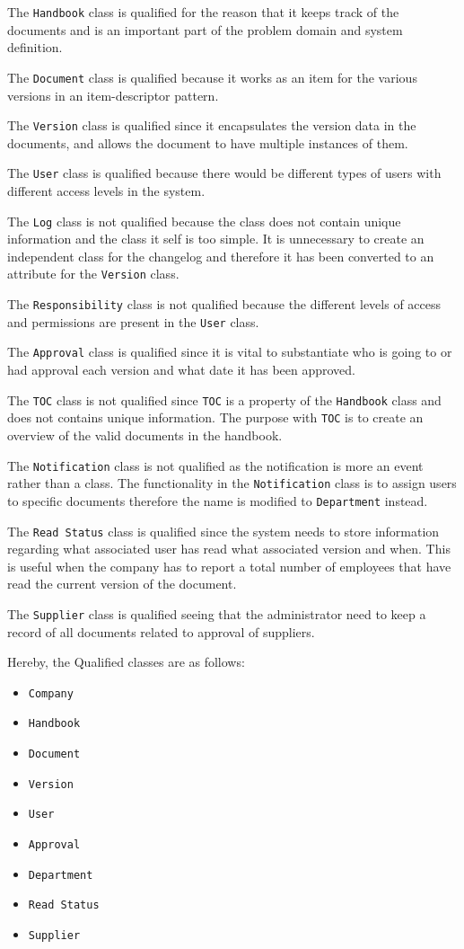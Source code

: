 The \texttt{Handbook} class is qualified for the reason that it keeps track of the documents and is an important part of the problem domain and system definition.

The \texttt{Document} class is qualified because it works as an item for the various versions in an item-descriptor pattern.

The \texttt{Version} class is qualified since it encapsulates the version data in the documents, and allows the document to have multiple instances of them.

The \texttt{User} class is qualified because there would be different types of users with different access levels in the system.

The \texttt{Log} class is not qualified because the class does not contain unique information and the class it self is too simple.
It is unnecessary to create an independent class for the changelog and therefore it has been converted to an attribute for the \texttt{Version} class.

The \texttt{Responsibility} class is not qualified because the different levels of access and permissions are present in the \texttt{User} class.

The \texttt{Approval} class is qualified since it is vital to substantiate who is going to or had approval each version and what date it has been approved.

The \texttt{TOC} class is not qualified since \texttt{TOC} is a property of the \texttt{Handbook} class and does not contains unique information.
The purpose with \texttt{TOC} is to create an overview of the valid documents in the handbook.

The \texttt{Notification} class is not qualified as the notification is more an event rather than a class.
The functionality in the \texttt{Notification} class is to assign users to specific documents therefore the name is modified to \texttt{Department} instead.

The \texttt{Read Status} class is qualified since the system needs to store information regarding what associated user has read what associated version and when.
This is useful when the company has to report a total number of employees that have read the current version of the document.

The \texttt{Supplier} class is qualified seeing that the administrator need to keep a record of all documents related to approval of suppliers. 

Hereby, the Qualified classes are as follows:
\begin{itemize} 
	\item \texttt{Company}
	\item \texttt{Handbook}
	\item \texttt{Document}
	\item \texttt{Version}
	\item \texttt{User}
	\item \texttt{Approval}
	\item \texttt{Department}
	\item \texttt{Read Status}
	\item \texttt{Supplier}
\end{itemize}

